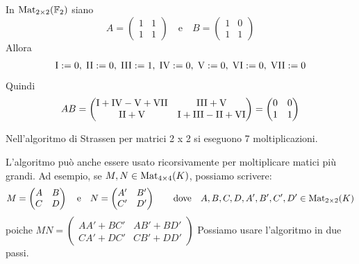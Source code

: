 \documentclass[../main.tex]{subfiles}
\begin{document}
\begin{example}
    In $\operatorname{Mat}_{2 \times 2}(\mathbb{F}_2)$ siano
    \begin{equation*}
        A = \begin{pmatrix} 1 & 1 \\ 1 & 1 \end{pmatrix} \quad \text{e} \quad B = \begin{pmatrix} 1 & 0 \\ 1 & 1 \end{pmatrix}
    \end{equation*}
    Allora
    \begin{equation*}
        \Roman 1 := 0, \;
        \Roman 2 := 0, \;
        \Roman 3 := 1, \;
        \Roman 4 := 0, \;
        \Roman 5  := 0, \;
        \Roman 6  := 0, \;
        \Roman 7  := 0
    \end{equation*}
    Quindi
    \begin{equation*}
        AB = \begin{pmatrix} \Roman 1 + \Roman 4 - \Roman 5 + \Roman 7 & \Roman 3 + \Roman 5 \\ \Roman 2 + \Roman 5 & \Roman 1 + \Roman 3 - \Roman 2 + \Roman 6 \end{pmatrix} =
        \begin{pmatrix} 0 & 0 \\ 1 & 1 \end{pmatrix}
    \end{equation*}
\end{example}

Nell'algoritmo di Strassen per matrici 2 x 2 si eseguono 7 moltiplicazioni.

L'algoritmo può anche essere usato ricorsivamente per moltiplicare matici più grandi. Ad esempio, se $M, N \in \operatorname{Mat}_{4 \times 4}(K)$, possiamo scrivere:
\begin{equation*}
    M = \begin{pmatrix} A & B \\ C & D \end{pmatrix} \quad \text{e} \quad N = \begin{pmatrix} A' & B' \\ C' & D' \end{pmatrix} \qquad
    \text{dove} \quad A, B, C, D, A', B', C', D' \in \operatorname{Mat}_{2 \times 2}(K)
\end{equation*}
poiche $MN = \begin{pmatrix} AA' + BC' & AB' + BD' \\ CA' + DC' & CB' + DD' \end{pmatrix}$
Possiamo usare l'algoritmo in due passi.
\end{document}
